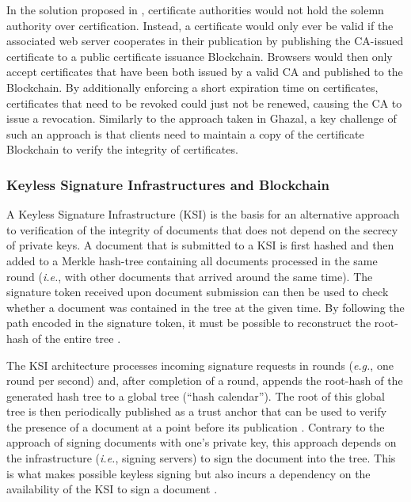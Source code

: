 In the solution proposed in \cite{zohar_blockchain-based_2019}, certificate authorities would not hold the solemn authority over certification. Instead, a certificate would only ever be valid if the associated web server cooperates in their publication by publishing the CA-issued certificate to a public certificate issuance Blockchain. Browsers would then only accept certificates that have been both issued by a valid CA and published to the Blockchain. By additionally enforcing a short expiration time on certificates, certificates that need to be revoked could just not be renewed, causing the CA to issue a revocation. Similarly to the approach taken in Ghazal, a key challenge of such an approach is that clients need to maintain a copy of the certificate Blockchain to verify the integrity of certificates.


\subsubsection{Keyless Signature Infrastructures and Blockchain}

A Keyless Signature Infrastructure (KSI) is the basis for an alternative approach to verification of the integrity of documents that does not depend on the secrecy of private keys. A document that is submitted to a KSI is first hashed and then added to a Merkle hash-tree containing all documents processed in the same round (\textit{i.e.}, with other documents that arrived around the same time). The signature token received upon document submission can then be used to check whether a document was contained in the tree at the given time. By following the path encoded in the signature token, it must be possible to reconstruct the root-hash of the entire tree \cite{hutchison_keyless_2013, jamthagen_blockchain-based_2016}.

The KSI architecture processes incoming signature requests in rounds (\textit{e.g.}, one round per second) and, after completion of a round, appends the root-hash of the generated hash tree to a global tree (``hash calendar''). The root of this global tree is then periodically published as a trust anchor that can be used to verify the presence of a document at a point before its publication \cite{hutchison_keyless_2013}. Contrary to the approach of signing documents with one's private key, this approach depends on the infrastructure (\textit{i.e.}, signing servers) to sign the document into the tree. This is what makes possible keyless signing but also incurs a dependency on the availability of the KSI to sign a document \cite{jamthagen_blockchain-based_2016}.

